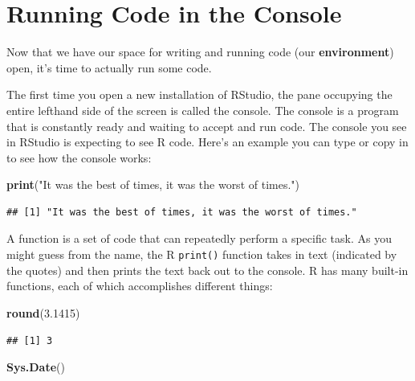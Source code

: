 \documentclass[]{Nemilov}
\newenvironment{Shaded}{\begin{snugshade}}{\end{snugshade}}
\newcommand{\FloatTok}[1]{\textcolor[rgb]{0.00,0.00,0.81}{#1}}
\newcommand{\KeywordTok}[1]{\textcolor[rgb]{0.13,0.29,0.53}{\textbf{#1}}}
\newcommand{\NormalTok}[1]{#1}
\newcommand{\StringTok}[1]{\textcolor[rgb]{0.31,0.60,0.02}{#1}}
\begin{document}
\hypertarget{r-getting-started-console}{%
\section{Running Code in the Console}\label{r-getting-started-console}}

Now that we have our space for writing and running code (our \textbf{environment})
open, it's time to
actually run some code.

The first time you open a new installation of RStudio,
the pane occupying the entire lefthand side of the screen is called the console.
The console is a program that is constantly ready and waiting to accept and run
code. The console you see in RStudio is expecting to see R code.
Here's an example you can type or copy in to see how the console works:

\begin{Shaded}
\begin{Highlighting}[]
\KeywordTok{print}\NormalTok{(}\StringTok{"It was the best of times, it was the worst of times."}\NormalTok{)}
\end{Highlighting}
\end{Shaded}

\begin{verbatim}
## [1] "It was the best of times, it was the worst of times."
\end{verbatim}

A function is a set of code that can repeatedly perform a specific task.
As you might guess from the name, the R \texttt{print()} function
takes in text (indicated by the quotes) and then prints the text back out to
the console.
R has many built-in functions, each of which accomplishes different things:

\begin{Shaded}
\begin{Highlighting}[]
\KeywordTok{round}\NormalTok{(}\FloatTok{3.1415}\NormalTok{)}
\end{Highlighting}
\end{Shaded}

\begin{verbatim}
## [1] 3
\end{verbatim}

\begin{Shaded}
\begin{Highlighting}[]
\KeywordTok{Sys.Date}\NormalTok{()}
\end{Highlighting}
\end{Shaded}
\end{document}

